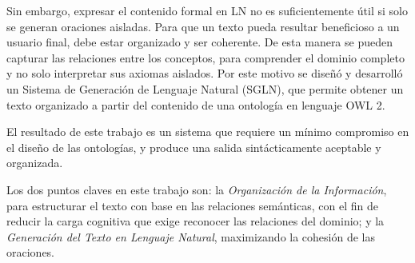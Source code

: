 Sin embargo, expresar el contenido formal en LN no es suficientemente útil si solo se generan oraciones aisladas. Para que un texto pueda resultar beneficioso a un usuario final, debe estar organizado y ser coherente. De esta manera se pueden capturar las relaciones entre los conceptos, para comprender el dominio completo y no solo interpretar sus axiomas aislados. Por este motivo se diseñó y desarrolló un Sistema de Generación de Lenguaje Natural (SGLN), que permite obtener un texto organizado a partir del contenido de una ontología en lenguaje OWL 2.


El resultado de este trabajo es un sistema que requiere un mínimo compromiso en el diseño de las ontologías, y produce una salida sintácticamente aceptable y organizada.

Los dos puntos claves en este trabajo son: la \textit{Organización de la Información}, para estructurar el texto con base en las relaciones semánticas, con el fin de reducir la carga cognitiva que exige reconocer las relaciones del dominio; y la \textit{Generación del Texto en Lenguaje Natural}, maximizando la cohesión de las oraciones.

\vfill
\pagebreak
